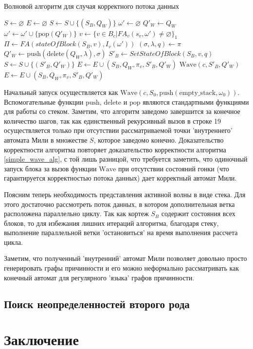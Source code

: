 \documentclass[10pt,a4paper]{article}
\newcommand{\FA}{F\!A}
\begin{document}
  \begin{algorithm}
    \caption{Волновой алгоритм для случая корректного потока данных}
    \label{wave_alg}
    \begin{algorithmic}[1]
      \State $S \leftarrow \varnothing$
      \State $E \leftarrow \varnothing$
         \State $S \leftarrow S \cup \{(S_B, Q_W)\}$
         \State $\omega' \leftarrow \varnothing$
         \State $Q'_W \leftarrow Q_W$
         \While{$\forall v \in B_c : \FA_v(s_v, \omega') = \varnothing \vee \neg \zeta(\sigma, \omega)$}
           \State $\omega' \leftarrow \omega' \cup \{\text{pop}(Q'_W)\}$
         \EndWhile
         \Statex
         \State $v \leftarrow \{v \in B_c \vert \FA_v(s_v, \omega') \neq \varnothing \}_1$
         \State $\Pi \leftarrow \FA(stateOfBlock(S_B, v), I_v(\omega'))$
           \State $(\sigma, \lambda, q) \leftarrow \pi$
           \State $Q'_W \leftarrow \text{push}(\text{delete}(Q_W, \lambda), \sigma)$
           \State $S'_B \leftarrow SetStateOfBlock(S_B, v, q)$
             \State $S \leftarrow S \cup \{(S'_B, Q'_W)\}$
             \State $E \leftarrow E \cup (S_B, Q_W, \pi_v, S'_B, Q'_W)$
             \State $\text{Wave}(c, S'_B, Q'_W)$
          \Else
             \State $E \leftarrow E \cup (S_B, Q_W, \pi_v, S'_B, Q'_W)$
          \EndIf
         \EndFor
      \EndFunction
    \end{algorithmic}
  \end{algorithm}
  
  Начальный запуск осуществляется как $\text{Wave}(c, S_0, \text{push}(\text{empty\_stack}, \omega_0))$.
  Вспомогательные функции $\text{push}$, $\text{delete}$ и $\text{pop}$ являются стандартными функциями для работы со стеком.
  Заметим, что алгоритм заведомо завершится за конечное количество шагов, так как единственный рекурсивный вызов в строке 19 осуществляется только при отсутствии рассматриваемой
  точки 'внутреннего' автомата Мили в множестве $S$, которое заведомо конечно. Доказательство корректности алгоритма повторяет доказательство
  корректности алгоритма \ref{simple_wave_alg}, с той лишь разницой, что требуется заметить, что одиночный запуск блока за вызов функции $\text{Wave}$ при отсутствии
  состояний гонки (что гарантируется корректностью потока данных) дает корректный автомат Мили.
  
  Поясним теперь необходимость представления активной волны в виде стека. Для этого достаточно рассмотреть поток данных, в котором дополнительная ветка расположена параллельно циклу.
  Так как кортеж $S_B$ содержит состояния всех блоков, то для избежания лишних итераций алгоритма, благодаря стеку, выполнение параллельной ветки 'остановиться' на время выполнения
  рассчета цикла.
  
  Заметим, что полученный 'внутренний' автомат Мили позволяет довольно просто генерировать графы причинности и его можно неформально рассматривать
  как конечный автомат для регулярного 'языка' графов причинности.
  
  
\subsection{Поиск неопределенностей второго рода}

\section{Заключение}
\end{document}
